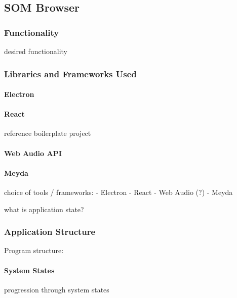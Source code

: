 \subsection{SOM Browser}
\label{subsec:implementation_som-browser}

\subsubsection{Functionality}
\label{subsubsec:som-browser_functionality}
desired functionality

\subsubsection{Libraries and Frameworks Used}
\label{subsubsec:som-browser_libraries}

\paragraph{Electron}
\label{para:electron}

\paragraph{React}
\label{para:react}
reference boilerplate project

\paragraph{Web Audio API}
\label{para:web_audio_api}

\paragraph{Meyda}
\label{para:meyda}

choice of tools / frameworks:
- Electron
- React
- Web Audio (?)
- Meyda

what is application state?

\subsubsection{Application Structure}
\label{subsubsec:som-browser_structure}

Program structure:

\paragraph{System States}
\label{para:som-browser_states}
progression through system states

